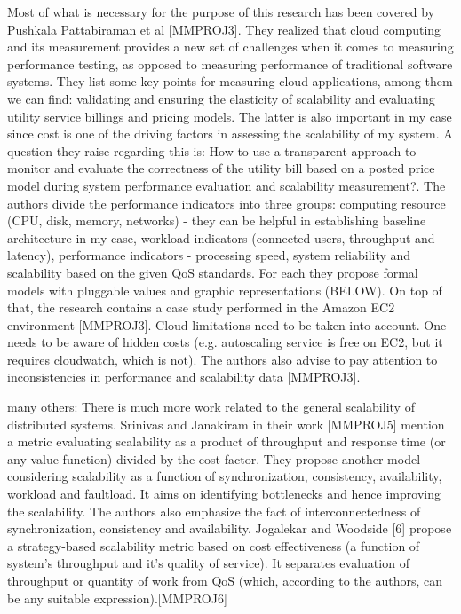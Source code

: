 \documentclass{uvamscse}
\begin{document}
Most of what is necessary for the purpose of this research has been covered by Pushkala Pattabiraman et al [MMPROJ3].
They realized that cloud computing and its measurement provides a new set of challenges when it comes to measuring performance testing, as opposed to measuring performance of  traditional software systems. They list some key points for measuring cloud applications, among them we can find: validating and ensuring the elasticity of scalability and evaluating utility service billings and pricing models. The latter is also important in my case since cost is one of the driving factors in assessing the scalability of my system. A question they raise regarding this is: How to use a transparent approach to monitor and evaluate the correctness of the utility bill based on a posted price model during system performance evaluation and scalability measurement?.
The authors divide the performance indicators into three groups:
computing resource (CPU, disk, memory, networks) - they can be helpful in establishing baseline architecture in my case,
workload indicators (connected users, throughput and latency),
performance indicators - processing speed, system reliability and scalability based on the given QoS standards.
For each they propose formal models with pluggable values and graphic representations (BELOW).
On top of that, the research contains a case study performed in the Amazon EC2 environment [MMPROJ3].
Cloud limitations need to be taken into account. One needs to be aware of hidden costs (e.g. autoscaling service is free on EC2, but it requires cloudwatch, which is not). The authors also advise to pay attention to inconsistencies in performance and scalability data [MMPROJ3].

many others:
There is much more work related to the general scalability of distributed systems. Srinivas and Janakiram in their work [MMPROJ5] mention a metric evaluating scalability as a product of throughput and response time (or any value function) divided by the cost factor. They propose another model considering scalability as a function of synchronization, consistency, availability, workload and faultload. It aims on identifying bottlenecks and hence improving the scalability. The authors also emphasize the fact of interconnectedness of synchronization, consistency and availability.
Jogalekar and Woodside [6] propose a strategy-based scalability metric based on cost effectiveness (a function of system's throughput and it’s quality of service). It separates evaluation of throughput or quantity of work from QoS (which, according to the authors, can be any suitable expression).[MMPROJ6]
\end{document}
